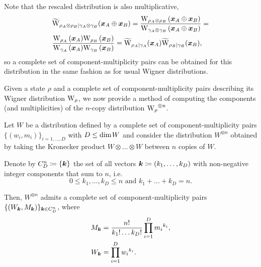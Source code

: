 Note that the rescaled distribution is also multiplicative,
\begin{align}
	&\widetilde{\rm{W}}_{\rho_A \otimes \rho_B | \gamma_A \otimes \gamma_B}(\bmx_A \oplus \bmx_B) = \frac{\W[\bmx_A \oplus \bmx_B]{\rho_A \otimes \rho_B}}{\W[\bmx_A \oplus \bmx_B]{\gamma_A \otimes \gamma_B}} = \nonumber \\
	&\frac{\W[\bmx_A]{\rho_A}\W[\bmx_B]{\rho_B}}{\W[\bmx_A]{\gamma_A}\W[\bmx_B]{\gamma_B}} = \widetilde{\rm{W}}_{\rho_A | \gamma_A}(\bmx_A)\widetilde{\rm{W}}_{\rho_B  | \gamma_B}(\bmx_B),
\end{align}
so a complete set of component-multiplicity pairs can be obtained for this distribution in the same fashion as for usual Wigner distributions.

Given a state $\rho$ and a complete set of component-multiplicity pairs describing its Wigner distribution $\W{\rho}$, we now provide a method of computing the components (and multiplicities) of the $n$-copy distribution $\W{\rho}^{\otimes n}$.
\begin{lemma}\label{lem:ncopycomponents}
	Let $W$ be a distribution defined by a complete set of component-multiplicity pairs $\{(w_i, m_i)\}_{i=1,\dots,D}$ with $D \leq {\rm{dim}}\hspace{1pt}W$ and consider the distribution $W^{\otimes n}$ obtained by taking the Kronecker product $W \otimes \dots \otimes W$ between $n$ copies of $W$.
	
	Denote by $C_D^n \coloneqq \{\bm{k}\}$ the set of all vectors $\bm{k} \coloneqq (k_1, \dots, k_D)$ with non-negative integer components that sum to $n$, i.e.
	\begin{equation*}
	0 \leq k_1, \dots, k_D \leq n \text{ and } k_1 + \dots + k_D = n.
	\end{equation*}
	
	Then, $W^{\otimes n}$ admits a complete set of component-multiplicity pairs $\{(W_{\bm{k}}, M_{\bm{k}})\}_{\bm{k} \in C_D^n}$, where
\begin{align}
	M_{\bm{k}} &= \frac{n!}{k_1!\dots k_D!} \prod\limits_{i=1}^D {m_i}^{k_i}, \label{eq:M}\\
	W_{\bm{k}} &= \prod\limits_{i=1}^D {w_i}^{k_i}. \label{eq:W}
\end{align}
\end{lemma}
